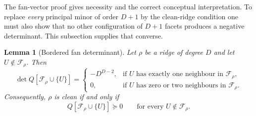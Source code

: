 \documentclass[11pt,reqno]{amsart}
\numberwithin{equation}{section}
\theoremstyle{plain}
\newtheorem{lemma}[theorem]{Lemma}
\theoremstyle{definition}
\newcommand{\Fset}{\mathcal F}
\begin{document}
The fan-vector proof gives necessity and the correct conceptual interpretation. To replace
\emph{every} principal minor of order $D+1$ by the clean-ridge condition one must also show that
no other configuration of $D+1$ facets produces a negative determinant. This subsection supplies
that converse.

\begin{lemma}[Bordered fan determinant]\label{lem:borderedfan}
Let $\rho$ be a ridge of degree $D$ and let $U\notin\Fset_\rho$. Then
\[
  \det Q[\Fset_\rho\cup\{U\}]
  =\begin{cases}
    -D^{D-2}, & \text{if $U$ has exactly one neighbour in $\Fset_\rho$},\\[2pt]
    0, & \text{if $U$ has zero or two neighbours in $\Fset_\rho$}.
  \end{cases}
\]
Consequently, $\rho$ is clean if and only if
\[
  Q[\Fset_\rho\cup\{U\}]\succeq0
  \qquad\text{for every }U\notin\Fset_\rho.
\]
\end{lemma}
\end{document}
